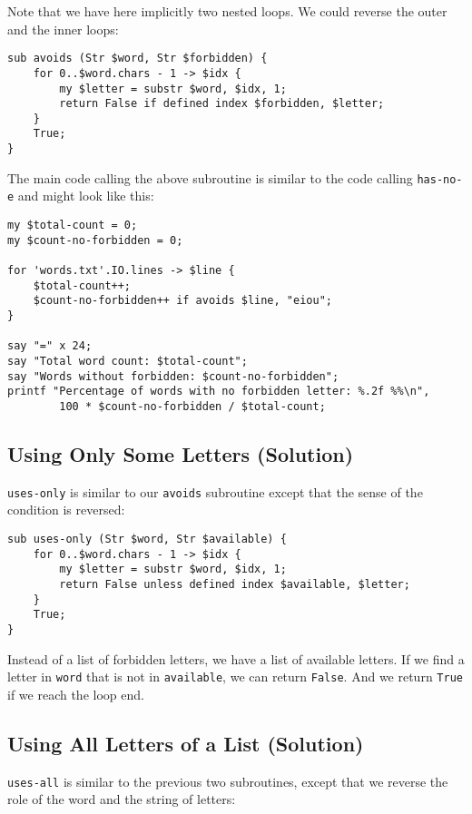 Note that we have here implicitly two nested loops. We could 
reverse the outer and the inner loops:

\begin{verbatim}
sub avoids (Str $word, Str $forbidden) {
    for 0..$word.chars - 1 -> $idx {
        my $letter = substr $word, $idx, 1;
        return False if defined index $forbidden, $letter;
    }
    True;
}
\end{verbatim}
%

The main code calling the above subroutine is similar to 
the code calling {\tt has-no-e} and might look like 
this:

\begin{verbatim}
my $total-count = 0;
my $count-no-forbidden = 0;

for 'words.txt'.IO.lines -> $line { 
    $total-count++;
    $count-no-forbidden++ if avoids $line, "eiou";
}

say "=" x 24;
say "Total word count: $total-count";
say "Words without forbidden: $count-no-forbidden";
printf "Percentage of words with no forbidden letter: %.2f %%\n", 
        100 * $count-no-forbidden / $total-count;
\end{verbatim}    
%
  

\subsection{Using Only Some Letters (Solution)}

\verb"uses-only" is similar to our {\tt avoids} subroutine 
except that the sense of the condition is reversed:

\begin{verbatim}
sub uses-only (Str $word, Str $available) {
    for 0..$word.chars - 1 -> $idx {
        my $letter = substr $word, $idx, 1;
        return False unless defined index $available, $letter;
    }
    True;
}
\end{verbatim}
%
Instead of a list of forbidden letters, we have a list 
of available letters.  If we find a letter in {\tt word} that 
is not in {\tt available}, we can return {\tt False}. And 
we return {\tt True} if we reach the loop end.

\subsection{Using All Letters of a List (Solution)}

\verb"uses-all" is similar to the previous two subroutines, 
except that we reverse the role of the word and the string 
of letters:

